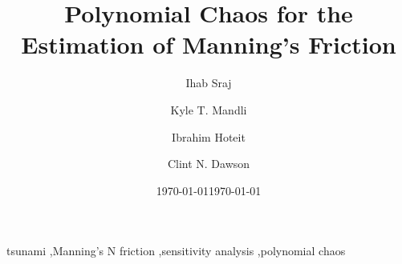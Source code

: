 \documentclass[preprint,12pt]{elsarticle}
\begin{document}
\ifpdf
{}
\else
{}
\fi

\begin{frontmatter}

\title{Polynomial Chaos for
 the Estimation of Manning's Friction}
\date{\today}

\author[kaust]{Ihab Sraj}
\author[ut]{Kyle T. Mandli}
\author[kaust]{Ibrahim Hoteit}
\author[ut]{Clint N. Dawson}

\address[kaust]{Department of Physical Sciences and Engineering, King Abdullah University for Science and Technology, Thuwal, Saudi Arabia}
\address[ut]{Institute for Computational Engineering and Science, University of Texas at Austin, 201 E 24th ST. Stop C0200, Austin, TX 78712-1229, USA}

\date{\today}

\begin{abstract}

\end{abstract}

\begin{keyword}
tsunami \sep Manning's N friction \sep sensitivity analysis \sep polynomial chaos
\end{keyword}

\end{frontmatter}
\linenumbers

% 










 
\clearpage

\clearpage


\end{document}
